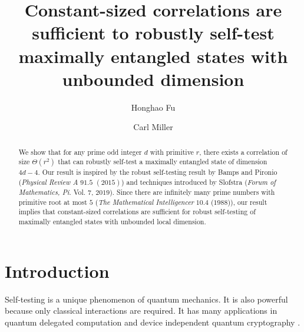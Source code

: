 \documentclass[11pt,letterpaper]{article}
\newcommand{\1}{\mathbb{1}}
\theoremstyle{definition}
\begin{document}
\title{Constant-sized correlations are sufficient to 
robustly self-test maximally entangled states with unbounded dimension}

\author[1]{Honghao Fu}
\author[1,2]{Carl Miller}

\renewcommand\Affilfont{\itshape\small}



\maketitle

\begin{abstract}
	We show that for any prime odd integer $d$ with primitive $r$, there exists a correlation of size
	$\Theta(r^2)$ 
	that can robustly self-test a maximally entangled state of dimension $4d-4$. Our result is
	inspired by the robust self-testing result by Bamps and Pironio (\textit{Physical Review A} $91.5$ $(2015)$) and
	techniques introduced by Slofstra (\textit{Forum of Mathematics, Pi}. Vol. $7$, $2019$). Since there are
	infinitely many prime numbers with primitive root at most $5$ (\textit{The Mathematical Intelligencer} $10.4$ ($1988$)), 
	our result implies that constant-sized correlations are sufficient for robust self-testing of maximally entangled states
	with unbounded local dimension.
\end{abstract}
\section{Introduction}
\label{sec:intro}
Self-testing is a unique phenomenon of quantum mechanics.
It is also powerful because only classical interactions are required.
It has many applications in quantum
delegated computation \cite{ruv2013,coladan2017verifier} and device independent quantum cryptography
\cite{mayersyao,vv2014,miller2017,fu2018,eat2018}.
\end{document}
